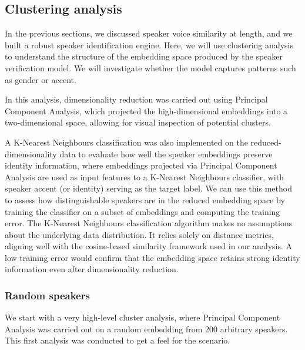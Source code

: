 \documentclass[conference]{IEEEtran}
\begin{document}
	\subsection{Clustering analysis}
	
	In the previous sections, we discussed speaker voice similarity at length, and we built a robust speaker identification engine. Here, we will use clustering analysis to understand the structure of the embedding space produced by the speaker verification model. We will investigate whether the model captures patterns such as gender or accent.
	
	In this analysis, dimensionality reduction was carried out using Principal Component Analysis, which projected the high-dimensional embeddings into a two-dimensional space, allowing for visual inspection of potential clusters.
	
	A K-Nearest Neighbours classification was also implemented on the reduced-dimensionality data to evaluate how well the speaker embeddings preserve identity information, where embeddings projected via Principal Component Analysis are used as input features to a K-Nearest Neighbours classifier, with speaker accent (or identity) serving as the target label. We can use this method to assess how distinguishable speakers are in the reduced embedding space by training the classifier on a subset of embeddings and computing the training error. The K-Nearest Neighbours classification algorithm makes no assumptions about the underlying data distribution. It relies solely on distance metrics, aligning well with the cosine-based similarity framework used in our analysis. A low training error would confirm that the embedding space retains strong identity information even after dimensionality reduction.
	
	\subsubsection{Random speakers}
	
	We start with a very high-level cluster analysis, where Principal Component Analysis was carried out on a random embedding from 200 arbitrary speakers. This first analysis was conducted to get a feel for the scenario.
	
\end{document}
